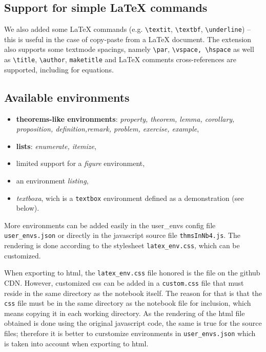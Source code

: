     \subsection{Support for simple LaTeX
commands}\label{support-for-simple-latex-commands}

    We also added some LaTeX commands (e.g. \texttt{\textbackslash{}textit},
\texttt{\textbackslash{}textbf}, \texttt{\textbackslash{}underline}) --
this is useful in the case of copy-paste from a LaTeX document. The
extension also supports some textmode spacings, namely
\texttt{\textbackslash{}par},
\texttt{\textbackslash{}vspace,\ \textbackslash{}hspace} as well as
\texttt{\textbackslash{}title}, \texttt{\textbackslash{}author},
\texttt{maketitle} and LaTeX comments %
cross-references are supported, including for equations.

    \subsection{Available environments}\label{available-environments}

    \begin{itemize}
\tightlist
\item
  \textbf{theorems-like environments}: \emph{property, theorem, lemma,
  corollary, proposition, definition,remark, problem, exercise,
  example},
\item
  \textbf{lists}: \emph{enumerate, itemize},\\
\item
  limited support for a \emph{figure} environment,
\item
  an environment \emph{listing},
\item
  \emph{textboxa}, wich is a \texttt{textbox} environment defined as a
  demonstration (see below).
\end{itemize}

More environments can be added easily in the user\_envs config file
\texttt{user\_envs.json} or directly in the javascript source file
\texttt{thmsInNb4.js}. The rendering is done according to the stylesheet
\texttt{latex\_env.css}, which can be customized.
\begin{remark} When exporting to html, the
\texttt{latex\_env.css} file honored is the file on the github CDN.
However, customized css can be added in a \texttt{custom.css} file that
must reside in the same directory as the notebook itself. The reason for
that is that the \texttt{css} file must be in the same directory as the
notebook file for inclusion, which means copying it in each working
directory. As the rendering of the html file obtained is done using the
original javascript code, the same is true for the source files;
therefore it is better to curstomize environments in
\texttt{user\_envs.json} which is taken into account when exporting to
html.\\
\end{remark}

